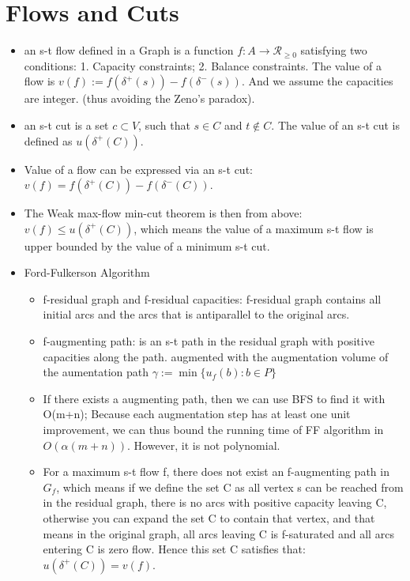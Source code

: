 \documentclass{article}
\begin{document}
\section{Flows and Cuts}
\begin{itemize}
\item an s-t flow defined in a Graph is a function $f: A\rightarrow \mathcal{R}_{\geq 0}$ satisfying two conditions: 1. Capacity constraints; 2. Balance constraints. The value of a flow is $v(f):=f(\delta^+(s))-f(\delta^-(s))$. And we assume the capacities are integer. (thus avoiding the Zeno's paradox).
\item an s-t cut is a set $c\subset V$, such that $s\in C$ and $t\notin C$. The value of an s-t cut is defined as $u(\delta^+(C))$.
\item Value of a flow can be expressed via an s-t cut: $v(f)=f(\delta^+(C)) - f(\delta^-(C))$.
\item The Weak max-flow min-cut theorem is then from above: $v(f)\leq u(\delta^+(C))$, which means the value of a maximum s-t flow is upper bounded by the value of a minimum s-t cut.
\item Ford-Fulkerson Algorithm
\begin{itemize}
\item f-residual graph and f-residual capacities: f-residual graph contains all initial arcs and the arcs that is antiparallel to the original arcs.
\item f-augmenting path: is an s-t path in the residual graph with positive capacities along the path. augmented with the augmentation volume of the aumentation path $\gamma:=\min\{u_f(b):b\in P\}$
\item If there exists a augmenting path, then we can use BFS to find it with O(m+n); Because each augmentation step has at least one unit improvement, we can thus bound the running time of FF algorithm in $O(\alpha(m+n))$. However, it is not polynomial.
\item For a maximum s-t flow f, there does not exist an f-augmenting path in $G_f$,  which means if we define the set C as all vertex s can be reached from in the residual graph, there is no arcs with positive capacity leaving C, otherwise you can expand the set C to contain that vertex, and that means in the original graph, all arcs leaving C is f-saturated and all arcs entering C is zero flow. Hence this set C satisfies that: $u(\delta^+(C))=v(f)$.


\end{itemize}
\end{itemize}
\end{document}
